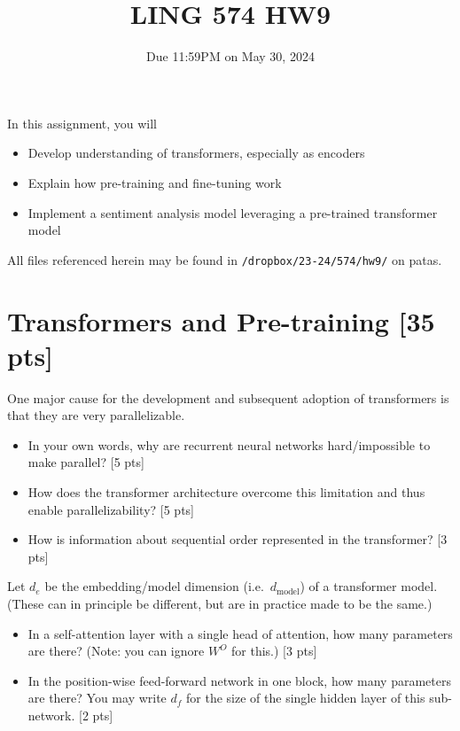 \documentclass[11pt]{article}
\begin{document}
\title{LING 574 HW9}
\date{\vspace{-0.2in}Due 11:59PM on May 30, 2024}
\maketitle


\noindent In this assignment, you will 
\begin{itemize}
  \item Develop understanding of transformers, especially as encoders
  \item Explain how pre-training and fine-tuning work
  \item Implement a sentiment analysis model leveraging a pre-trained transformer model
\end{itemize}
All files referenced herein may be found in \texttt{/dropbox/23-24/574/hw9/} on patas.


\section{Transformers and Pre-training [35 pts]}

 One major cause for the development and subsequent adoption of transformers is that they are very parallelizable.
\begin{itemize}
  \item In your own words, why are recurrent neural networks hard/impossible to make parallel? \hfill [5 pts]
  \item How does the transformer architecture overcome this limitation and thus enable parallelizability? \hfill [5 pts]
  \item How is information about sequential order represented in the transformer? \hfill [3 pts]
\end{itemize}

\vspace{2em}
 Let $d_e$ be the embedding/model dimension (i.e.\ $d_\text{model}$) of a transformer model.  (These can in principle be different, but are in practice made to be the same.)
\begin{itemize}
  \item In a self-attention layer with a single head of attention, how many parameters are there? (Note: you can ignore $W^O$ for this.) \hfill [3 pts]
  \item In the position-wise feed-forward network in one block, how many parameters are there? You may write $d_f$ for the size of the single hidden layer of this sub-network. \hfill [2 pts]
\end{itemize}
\end{document}
